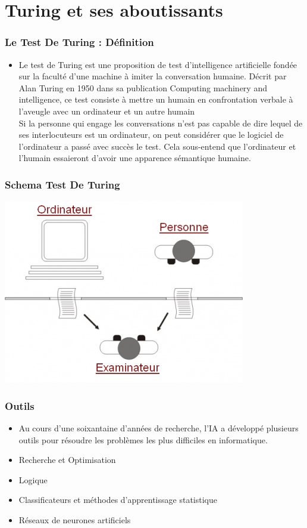 \documentclass{beamer}
\begin{document}
	
	\section{Turing et ses aboutissants}
	\begin{frame}
		\frametitle{Le Test De Turing : Définition}
		\begin{itemize}
		 \item Le test de Turing est une proposition de test d’intelligence artificielle fondée sur la faculté d'une machine à imiter la conversation humaine. Décrit par Alan Turing en 1950 dans sa publication Computing machinery and intelligence, ce test consiste à mettre un humain en confrontation verbale à l’aveugle avec un ordinateur et un autre humain \\
		 Si la personne qui engage les conversations n’est pas capable de dire lequel de ses interlocuteurs est un ordinateur, on peut considérer que le logiciel de l’ordinateur a passé avec succès le test. Cela sous-entend que l’ordinateur et l’humain essaieront d’avoir une apparence sémantique humaine.
		
		\end{itemize}
		\end{frame}
		
	\begin{frame}
		\frametitle{Schema Test De Turing}
		
		\centerline{\includegraphics[scale = 0.7]{test-de-turing.png}}
	
	\end{frame}
	
	\begin{frame}
		\frametitle{Outils}
		\begin{itemize}
			\item Au cours d'une soixantaine d'années de recherche, l'IA a développé plusieurs outils pour résoudre les problèmes les plus difficiles en informatique.
			\item Recherche et Optimisation
			\item Logique
			\item Classificateurs et méthodes d'apprentissage statistique
			\item Réseaux de neurones artificiels
		\end{itemize}
	\end{frame}
	
\end{document}
